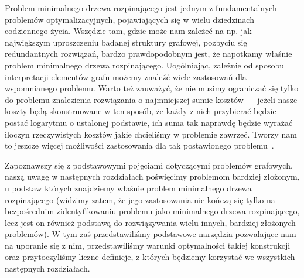 Problem minimalnego drzewa rozpinającego jest jednym z fundamentalnych problemów optymalizacyjnych, pojawiających się w wielu dziedzinach codziennego życia. Wszędzie tam, gdzie może nam zależeć na np. jak największym uproszczeniu badanej struktury grafowej, pozbyciu się redundantnych rozwiązań, bardzo prawdopodobnym jest, że napotkamy właśnie problem minimalnego drzewa rozpinającego. Uogólniając, zależnie od sposobu interpretacji elementów grafu możemy znaleźć wiele zastosowań dla wspomnianego problemu. Warto też zauważyć, że nie musimy ograniczać się tylko do problemu znalezienia rozwiązania o najmniejszej sumie kosztów --- jeżeli nasze koszty będą skonstruowane w ten sposób, że każdy z nich przybierać będzie postać logarytmu o ustalonej podstawie, ich suma tak naprawdę będzie wyrażać iloczyn rzeczywistych kosztów jakie chcieliśmy w problemie zawrzeć. Tworzy nam to jeszcze więcej możliwości zastosowania dla tak postawionego problemu~\cite[$512$--$516$]{Ahuja:1993:NFT:137406}.

Zapoznawszy się z podstawowymi pojęciami dotyczącymi problemów grafowych, naszą uwagę w następnych rozdziałach poświęcimy problemom bardziej złożonym, u podstaw których znajdziemy właśnie problem minimalnego drzewa rozpinającego (widzimy zatem, że jego zastosowania nie kończą się tylko na bezpośrednim zidentyfikowaniu problemu jako minimalnego drzewa rozpinającego, lecz jest on również podstawą do rozwiązywania wielu innych, bardziej złożonych problemów). W tym zaś przedstawiliśmy podstawowe narzędzia pozwalające nam na uporanie się z nim, przedstawiliśmy warunki optymalności takiej konstrukcji oraz przytoczyliśmy liczne definicje, z których będziemy korzystać we wszystkich następnych rozdziałach.
